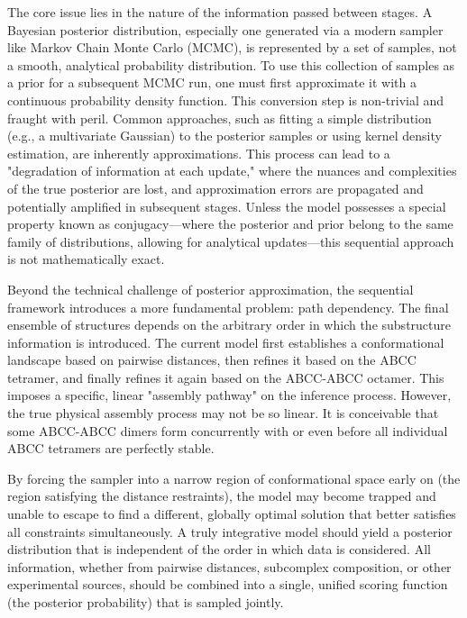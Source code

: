 \documentclass{article}
\begin{document}
The core issue lies in the nature of the information passed between stages. A Bayesian posterior distribution, especially one generated via a modern sampler like Markov Chain Monte Carlo (MCMC), is represented by a set of samples, not a smooth, analytical probability distribution.\cite{ref2} To use this collection of samples as a prior for a subsequent MCMC run, one must first approximate it with a continuous probability density function. This conversion step is non-trivial and fraught with peril. Common approaches, such as fitting a simple distribution (e.g., a multivariate Gaussian) to the posterior samples or using kernel density estimation, are inherently approximations. This process can lead to a "degradation of information at each update," where the nuances and complexities of the true posterior are lost, and approximation errors are propagated and potentially amplified in subsequent stages.\cite{ref2} Unless the model possesses a special property known as conjugacy—where the posterior and prior belong to the same family of distributions, allowing for analytical updates—this sequential approach is not mathematically exact.\cite{ref2}

Beyond the technical challenge of posterior approximation, the sequential framework introduces a more fundamental problem: path dependency. The final ensemble of structures depends on the arbitrary order in which the substructure information is introduced. The current model first establishes a conformational landscape based on pairwise distances, then refines it based on the ABCC tetramer, and finally refines it again based on the ABCC-ABCC octamer. This imposes a specific, linear "assembly pathway" on the inference process. However, the true physical assembly process may not be so linear. It is conceivable that some ABCC-ABCC dimers form concurrently with or even before all individual ABCC tetramers are perfectly stable.

By forcing the sampler into a narrow region of conformational space early on (the region satisfying the distance restraints), the model may become trapped and unable to escape to find a different, globally optimal solution that better satisfies all constraints simultaneously. A truly integrative model should yield a posterior distribution that is independent of the order in which data is considered.\cite{ref4} All information, whether from pairwise distances, subcomplex composition, or other experimental sources, should be combined into a single, unified scoring function (the posterior probability) that is sampled jointly.\cite{ref5}
\end{document}
